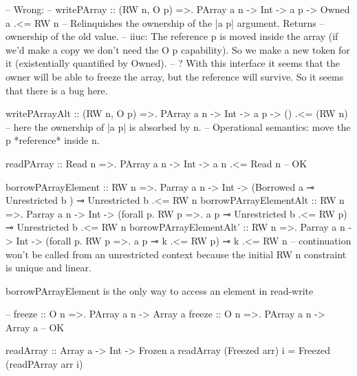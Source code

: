 \begin{spec}
-- Wrong:
-- writePArray  :: (RW n, O p) =>. PArray a n -> Int -> a p -> Owned a .<= RW n
  -- Relinquishes the ownership of the |a p| argument. Returns
  -- ownership of the old value.
  -- iiuc: The reference p is moved inside the array (if we'd make a copy we don't need the O p capability). So we make a new token for it (existentially quantified by Owned).
  -- ? With this interface it seems that the owner will be able to freeze the array, but the reference will survive. So it seems that there is a bug here.

writePArrayAlt  :: (RW n, O p) =>. PArray a n -> Int -> a p -> () .<= (RW n)
-- here the ownership of |a p| is absorbed by n.
-- Operational semantics: move the p *reference* inside n.

readPArray   :: Read n =>. PArray a n -> Int -> a n .<= Read n
-- OK

borrowPArrayElement     :: RW n =>. Parray a n -> Int -> (Borrowed a             ⊸ Unrestricted b         ) ⊸ Unrestricted b .<= RW n
borrowPArrayElementAlt  :: RW n =>. Parray a n -> Int -> (forall p. RW p =>. a p ⊸ Unrestricted b .<= RW p) ⊸ Unrestricted b .<= RW n
borrowPArrayElementAlt' :: RW n =>. Parray a n -> Int -> (forall p. RW p =>. a p ⊸ k              .<= RW p) ⊸              k .<= RW n -- continuation won't be called from an unrestricted context because the initial RW n constraint is unique and linear.

borrowPArrayElement is the only way to access an element in read-write

-- freeze       :: O n =>. PArray a n -> Array a
freeze       :: O n =>. PArray a n -> Array a
-- OK


readArray :: Array a -> Int -> Frozen a
readArray (Freezed arr) i = Freezed (readPArray arr i)
\end{spec}
